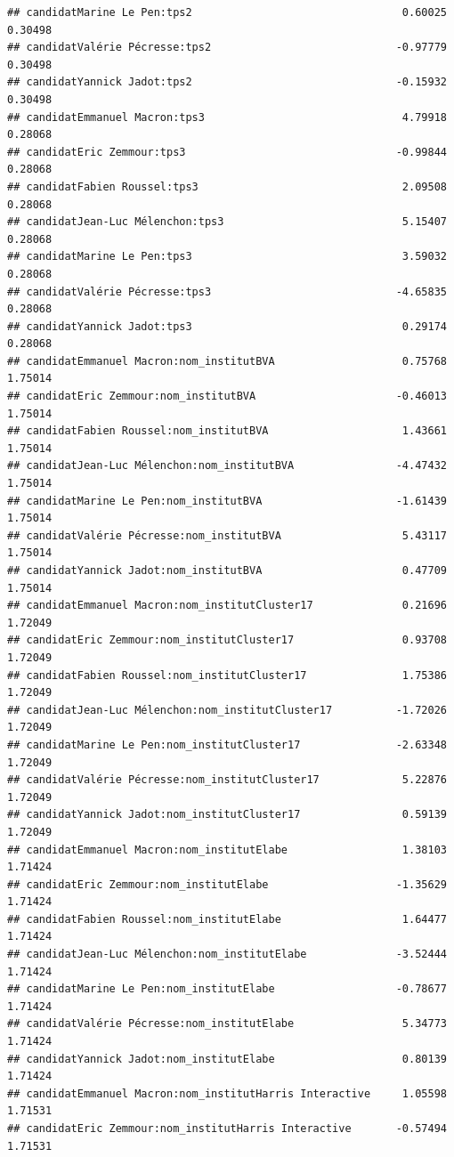 \documentclass[
]{book}
\begin{document}
\begin{verbatim}
## candidatMarine Le Pen:tps2                                 0.60025    0.30498
## candidatValérie Pécresse:tps2                             -0.97779    0.30498
## candidatYannick Jadot:tps2                                -0.15932    0.30498
## candidatEmmanuel Macron:tps3                               4.79918    0.28068
## candidatEric Zemmour:tps3                                 -0.99844    0.28068
## candidatFabien Roussel:tps3                                2.09508    0.28068
## candidatJean-Luc Mélenchon:tps3                            5.15407    0.28068
## candidatMarine Le Pen:tps3                                 3.59032    0.28068
## candidatValérie Pécresse:tps3                             -4.65835    0.28068
## candidatYannick Jadot:tps3                                 0.29174    0.28068
## candidatEmmanuel Macron:nom_institutBVA                    0.75768    1.75014
## candidatEric Zemmour:nom_institutBVA                      -0.46013    1.75014
## candidatFabien Roussel:nom_institutBVA                     1.43661    1.75014
## candidatJean-Luc Mélenchon:nom_institutBVA                -4.47432    1.75014
## candidatMarine Le Pen:nom_institutBVA                     -1.61439    1.75014
## candidatValérie Pécresse:nom_institutBVA                   5.43117    1.75014
## candidatYannick Jadot:nom_institutBVA                      0.47709    1.75014
## candidatEmmanuel Macron:nom_institutCluster17              0.21696    1.72049
## candidatEric Zemmour:nom_institutCluster17                 0.93708    1.72049
## candidatFabien Roussel:nom_institutCluster17               1.75386    1.72049
## candidatJean-Luc Mélenchon:nom_institutCluster17          -1.72026    1.72049
## candidatMarine Le Pen:nom_institutCluster17               -2.63348    1.72049
## candidatValérie Pécresse:nom_institutCluster17             5.22876    1.72049
## candidatYannick Jadot:nom_institutCluster17                0.59139    1.72049
## candidatEmmanuel Macron:nom_institutElabe                  1.38103    1.71424
## candidatEric Zemmour:nom_institutElabe                    -1.35629    1.71424
## candidatFabien Roussel:nom_institutElabe                   1.64477    1.71424
## candidatJean-Luc Mélenchon:nom_institutElabe              -3.52444    1.71424
## candidatMarine Le Pen:nom_institutElabe                   -0.78677    1.71424
## candidatValérie Pécresse:nom_institutElabe                 5.34773    1.71424
## candidatYannick Jadot:nom_institutElabe                    0.80139    1.71424
## candidatEmmanuel Macron:nom_institutHarris Interactive     1.05598    1.71531
## candidatEric Zemmour:nom_institutHarris Interactive       -0.57494    1.71531

\end{verbatim}
\end{document}
